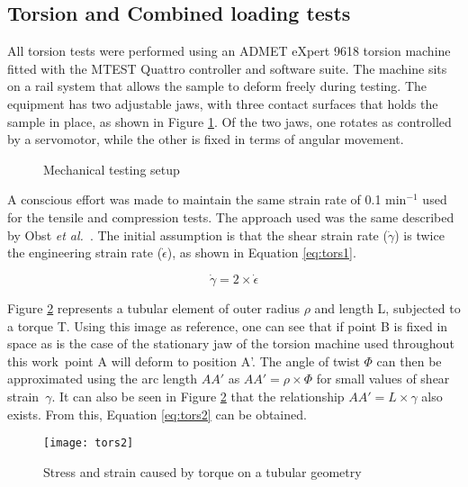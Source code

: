 \documentclass[main.tex]{subfiles}
\begin{document}
\subsection{Torsion and Combined loading tests}

All torsion tests were performed using an ADMET eXpert 9618 torsion machine fitted with the MTEST Quattro controller and software suite. The machine sits on a rail system that allows the sample to deform freely during testing. The equipment has two adjustable jaws, with three contact surfaces that holds the sample in place, as shown in Figure \ref{fig:testsetup}. Of the two jaws, one rotates as controlled by a servomotor, while the other is fixed in terms of angular movement. 

\begin{figure}[h]
	\center
	\hfill
	\caption{Mechanical testing setup} \label{fig:testsetup}
\end{figure} 

A conscious effort was made to maintain the same strain rate of 0.1 min$^{-1}$ used for the tensile and compression tests. The approach used was the same described by Obst \emph{et al.}~\cite{Obst2018}. The initial assumption is that the shear strain rate ($\dot{\gamma}$) is twice the engineering strain rate ($\dot{\epsilon}$), as shown in Equation \ref{eq:tors1}.

\begin{equation}\label{eq:tors1}
\dot{\gamma}= 2 \times \dot{\epsilon} 
\end{equation}

Figure \ref{fig:torscal} represents a tubular element of outer radius $\rho$ and length L, subjected to a torque T. Using this image as reference, one can see that if point B is fixed in space \textemdash as is the case of the stationary jaw of the torsion machine used throughout this work~\textemdash point A will deform to position A'. The angle of twist $\Phi$ can then be approximated using the arc length $AA'$ as $AA'=\rho \times \Phi$ for small values of shear strain~$\gamma$. It can also be seen in Figure \ref{fig:torscal} that the relationship $AA'=L\times \gamma$ also exists. From this, Equation \ref{eq:tors2} can be obtained.

\begin{figure}[h]
	\center
	\texttt{[image: tors2]}
	\caption{Stress and strain caused by torque on a tubular geometry~\cite{Obst2018}} \label{fig:torscal}
\end{figure} 
\end{document}
